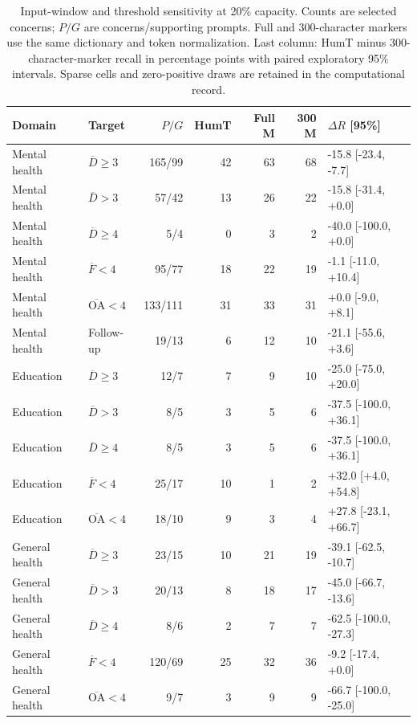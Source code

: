 \begin{table}[t]
\centering\small
\caption{Input-window and threshold sensitivity at 20\% capacity. Counts are selected concerns; $P/G$ are concerns/supporting prompts. Full and 300-character markers use the same dictionary and token normalization. Last column: HumT minus 300-character-marker recall in percentage points with paired exploratory 95\% intervals. Sparse cells and zero-positive draws are retained in the computational record.}
\label{tab:prefix_threshold}
\begin{tabular}{llrrrrl}
\toprule
Domain & Target & $P/G$ & HumT & Full M & 300 M & $\Delta R$ [95\%] \\
\midrule
Mental health & $\overline D\geq3$ & 165/99 & 42 & 63 & 68 & -15.8 [-23.4, -7.7] \\
Mental health & $\overline D>3$ & 57/42 & 13 & 26 & 22 & -15.8 [-31.4, +0.0] \\
Mental health & $\overline D\geq4$ & 5/4 & 0 & 3 & 2 & -40.0 [-100.0, +0.0] \\
Mental health & $\overline F<4$ & 95/77 & 18 & 22 & 19 & -1.1 [-11.0, +10.4] \\
Mental health & $\overline{\mathrm{OA}}<4$ & 133/111 & 31 & 33 & 31 & +0.0 [-9.0, +8.1] \\
Mental health & Follow-up & 19/13 & 6 & 12 & 10 & -21.1 [-55.6, +3.6] \\
Education & $\overline D\geq3$ & 12/7 & 7 & 9 & 10 & -25.0 [-75.0, +20.0] \\
Education & $\overline D>3$ & 8/5 & 3 & 5 & 6 & -37.5 [-100.0, +36.1] \\
Education & $\overline D\geq4$ & 8/5 & 3 & 5 & 6 & -37.5 [-100.0, +36.1] \\
Education & $\overline F<4$ & 25/17 & 10 & 1 & 2 & +32.0 [+4.0, +54.8] \\
Education & $\overline{\mathrm{OA}}<4$ & 18/10 & 9 & 3 & 4 & +27.8 [-23.1, +66.7] \\
General health & $\overline D\geq3$ & 23/15 & 10 & 21 & 19 & -39.1 [-62.5, -10.7] \\
General health & $\overline D>3$ & 20/13 & 8 & 18 & 17 & -45.0 [-66.7, -13.6] \\
General health & $\overline D\geq4$ & 8/6 & 2 & 7 & 7 & -62.5 [-100.0, -27.3] \\
General health & $\overline F<4$ & 120/69 & 25 & 32 & 36 & -9.2 [-17.4, +0.0] \\
General health & $\overline{\mathrm{OA}}<4$ & 9/7 & 3 & 9 & 9 & -66.7 [-100.0, -25.0] \\
\bottomrule
\end{tabular}
\end{table}
